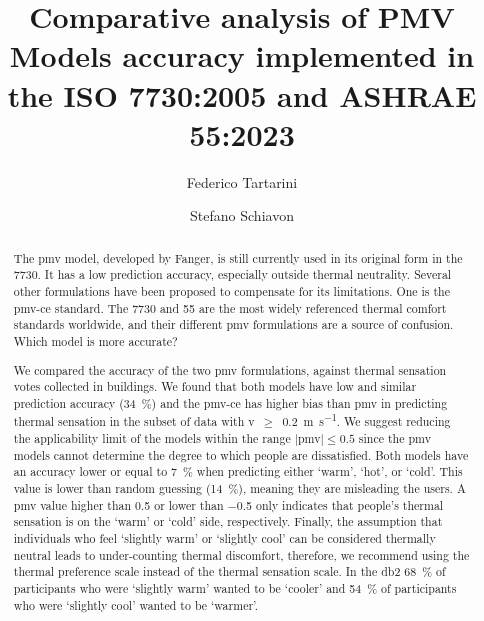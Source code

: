 \begin{frontmatter}

    \title{Comparative analysis of PMV Models accuracy implemented in the ISO 7730:2005 and ASHRAE 55:2023}

    \author[label1]{Federico Tartarini}
    \author[label3]{Stefano Schiavon}

    \address[label1]{The University of Sydney, Sydney, AU}
    \address[label3]{Center for the Built Environment, University of California, Berkeley, CA, USA}


    \begin{abstract}
        The \ac{pmv} model, developed by Fanger, is still currently used in its original form in the \gls{7730}.
        It has a low prediction accuracy, especially outside thermal neutrality.
        Several other formulations have been proposed to compensate for its limitations.
        One is the \ac{pmv-ce} standard.
        The \gls{7730} and \gls{55} are the most widely referenced thermal comfort standards worldwide, and their different \ac{pmv} formulations are a source of confusion.
        Which model is more accurate?

        We compared the accuracy of the two \ac{pmv} formulations, against  thermal sensation votes collected in buildings.
        We found that both models have low and similar prediction accuracy (\qty{34}{\percent}) and the \ac{pmv-ce} has higher bias than \ac{pmv} in predicting thermal sensation in the subset of data with \ac{v}~$\geq$~\qty{0.2}{\m\per\s}.
        We suggest reducing the applicability limit of the models within the range $\mid$\ac{pmv}$\mid \leq 0.5$ since the \ac{pmv} models cannot determine the degree to which people are dissatisfied.
        Both models have an accuracy lower or equal to \qty{7}{\percent} when predicting either `warm', `hot', or `cold'.
        This value is lower than random guessing (\qty{14}{\percent}), meaning they are misleading the users.
        A \ac{pmv} value higher than \num{.5} or lower than \num{-.5} only indicates that people's thermal sensation is on the `warm' or `cold' side, respectively.
        Finally, the assumption that individuals who feel `slightly warm' or `slightly cool' can be considered thermally neutral leads to under-counting thermal discomfort, therefore, we recommend using the thermal preference scale instead of the thermal sensation scale.
        In the \ac{db2} \qty{68}{\percent} of participants who were `slightly warm' wanted to be `cooler' and \qty{54}{\percent} of participants who were `slightly cool' wanted to be `warmer'.
    \end{abstract}


\end{frontmatter}
